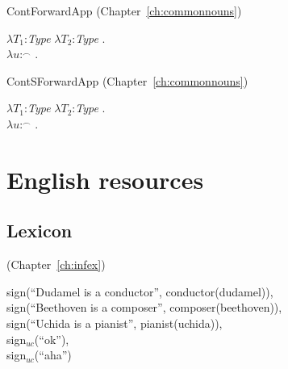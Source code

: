 ContForwardApp (Chapter~\ref{ch:commonnouns})

$\lambda T_1$:\textit{Type} $\lambda T_2$:\textit{Type} . \\
\hspace*{1em}$\lambda
u$:$^{\frown}$ . \\
\hspace*{2em}

ContSForwardApp (Chapter~\ref{ch:commonnouns})

$\lambda T_1$:\textit{Type} $\lambda T_2$:\textit{Type} . \\
\hspace*{1em}$\lambda
u$:$^{\frown}$
    . \\
\hspace*{2em} 

\section{English resources}

\subsection{Lexicon}
\label{app:lexeng}

(Chapter~\ref{ch:infex})

sign(``Dudamel is a conductor'', conductor(dudamel)), \\ 
sign(``Beethoven
is a composer'', composer(beethoven)), \\
sign(``Uchida is a
pianist'', pianist(uchida)), \\
sign$_{\mathit{uc}}$(``ok''), \\
sign$_{\mathit{uc}}$(``aha'')

